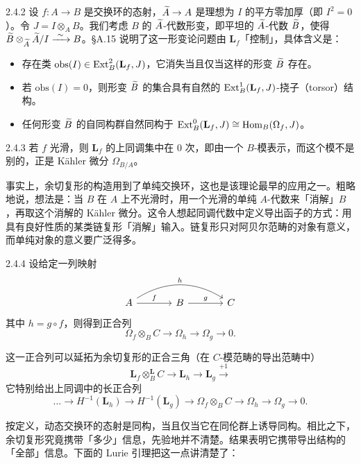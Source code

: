 \begin{exam}{2.4.2}\label{exam:a6-01-3}
设 $f:A\to B$ 是交换环的态射，$\widetilde A\to A$ 是理想为 $I$ 的平方零加厚（即 $I^2=0$）。令 $J=I\otimes_A B$。我们考虑 $B$ 的 $\widetilde A$-代数形变，即平坦的 $\widetilde A$-代数 $\widetilde B$，使得 $\widetilde B\otimes_{\widetilde A}\widetilde A/I\xrightarrow{\ \sim\ } B$。§A.15 说明了这一形变论问题由 $\mathbf L_f$「控制」，具体含义是：
\begin{itemize}[leftmargin=1.6em]
\item 存在类 $\mathrm{obs}(I)\in\operatorname{Ext}^2_B(\mathbf L_f,J)$，它消失当且仅当这样的形变 $\widetilde B$ 存在。
\item 若 $\mathrm{obs}(I)=0$，则形变 $\widetilde B$ 的集合具有自然的 $\operatorname{Ext}^1_B(\mathbf L_f,J)$-挠子（torsor）结构。
\item 任何形变 $\widetilde B$ 的自同构群自然同构于 $\operatorname{Ext}^0_B(\mathbf L_f,J)\cong\operatorname{Hom}_B(\Omega_f,J)$。
\end{itemize}
\end{exam}

\begin{exam}{2.4.3}\label{exam:a6-01-4}
若 $f$ 光滑，则 $\mathbf L_f$ 的上同调集中在 0 次，即由一个 $B$-模表示，而这个模不是别的，正是 Kähler 微分 $\Omega_{B/A}$。
\end{exam}

事实上，余切复形的构造用到了单纯交换环，这也是该理论最早的应用之一。粗略地说，想法是：当 $B$ 在 $A$ 上不光滑时，用一个光滑的单纯 $A$-代数来「消解」$B$，再取这个消解的 Kähler 微分。这令人想起同调代数中定义导出函子的方式：用具有良好性质的某类链复形「消解」输入。链复形只对阿贝尔范畴的对象有意义，而单纯对象的意义要广泛得多。

\begin{exam}{2.4.4}\label{exam:a6-01-5}
设给定一列映射
\begin{equation*}
\begin{tikzcd}[column sep=large]
A \arrow[r, "f"] \arrow[rr, bend left=32, "h"] & B \arrow[r, "g"] & C
\end{tikzcd}
\end{equation*}
其中 $h=g\circ f$，则得到正合列
\[
\Omega_f\otimes_B C\to\Omega_h\to\Omega_g\to 0.
\]
\end{exam}

这一正合列可以延拓为余切复形的正合三角（在 $C$-模范畴的导出范畴中）
\[
\mathbf L_f\otimes^{\mathbf L}_B C\to\mathbf L_h\to\mathbf L_g\xrightarrow{+1}
\]
它特别给出上同调中的长正合列
\[
\dots\to H^{-1}(\mathbf L_h)\to H^{-1}(\mathbf L_g)\to\Omega_f\otimes_B C\to\Omega_h\to\Omega_g\to 0.
\]

按定义，动态交换环的态射是同构，当且仅当它在同伦群上诱导同构。相比之下，余切复形究竟携带「多少」信息，先验地并不清楚。结果表明它携带导出结构的「全部」信息。下面的 Lurie 引理把这一点讲清楚了：


